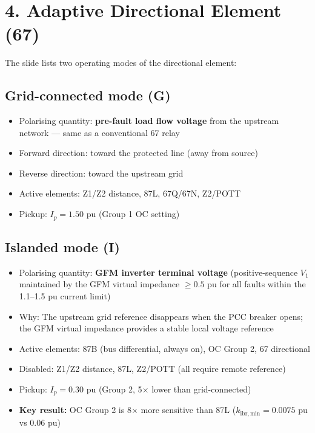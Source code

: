 \documentclass[12pt,a4paper]{article}
\begin{document}
\section{4.\; Adaptive Directional Element (67)}

The slide lists two operating modes of the directional element:

\subsection{Grid-connected mode (G)}

\begin{itemize}[nosep]
  \item Polarising quantity: \textbf{pre-fault load flow voltage} from the upstream
        network — same as a conventional 67 relay
  \item Forward direction: toward the protected line (away from source)
  \item Reverse direction: toward the upstream grid
  \item Active elements: Z1/Z2 distance, 87L, 67Q/67N, Z2/POTT
  \item Pickup: $I_p = 1.50$ pu (Group 1 OC setting)
\end{itemize}

\subsection{Islanded mode (I)}

\begin{itemize}[nosep]
  \item Polarising quantity: \textbf{GFM inverter terminal voltage} (positive-sequence
        $V_1$ maintained by the GFM virtual impedance $\geq 0.5$ pu for all faults
        within the 1.1--1.5 pu current limit)
  \item Why: The upstream grid reference disappears when the PCC breaker opens;
        the GFM virtual impedance provides a stable local voltage reference
  \item Active elements: 87B (bus differential, always on), OC Group 2, 67 directional
  \item Disabled: Z1/Z2 distance, 87L, Z2/POTT (all require remote reference)
  \item Pickup: $I_p = 0.30$ pu (Group 2, 5$\times$ lower than grid-connected)
  \item \textbf{Key result:} OC Group 2 is 8$\times$ more sensitive than 87L
        ($k_\mathrm{ibr,min} = 0.0075$ pu vs 0.06 pu)
\end{itemize}
\end{document}
